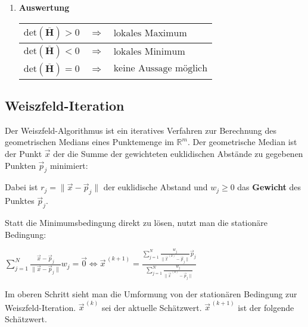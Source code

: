 \begin{enumerate}[itemsep=1ex]
    \item \textbf{Auswertung}\\
    \begin{tabular}{lll}
        \hline
        $\text{det}\left(\overline{\mathbf{H}}\right) > 0$ &$\Longrightarrow$& $\text{lokales Maximum}$\\
        \hline
        $\text{det}\left(\overline{\mathbf{H}}\right) < 0$ &$\Longrightarrow$& $\text{lokales Minimum}$\\
        \hline
        $\text{det}\left(\overline{\mathbf{H}}\right) = 0$ &$\Longrightarrow$& $\text{keine Aussage möglich}$\\
        \hline
    \end{tabular}

\end{enumerate}

\subsection{Weiszfeld-Iteration}
Der Weiszfeld-Algorithmus ist ein iteratives Verfahren zur Berechnung des
geometrischen Medians eines Punktemenge im $\mathbb{R}^m$. Der geometrische
Median ist der Punkt $\vec{x}$ der die Summe der gewichteten euklidischen Abstände
zu gegebenen Punkten $\vec{p}_j$ minimiert:
\begin{center}
\end{center}
\vspace{0.1cm}
Dabei ist $r_j = \parallel \vec{x} - \vec{p}_j \parallel$ der euklidische Abstand und $w_j \geq 0$ das \textbf{Gewicht} des Punktes $\vec{p}_j$.

\vspace{0.1cm}
Statt die Minimumsbedingung direkt zu lösen, nutzt man die stationäre Bedingung:
\vspace{0.1cm}

\begin{center}
    $\boxed{ \sum_{j = 1}^{N} \frac{\vec{x}-\vec{p}_j}{\parallel \vec{x} - \vec{p}_j \parallel}w_j = \vec{0} }
    \Leftrightarrow \boxed{\vec{x}^{\, (k+1)} = \frac{\sum_{j = 1}^{N} \frac{w_j}{\parallel \vec{x}^{\, (k)} - \vec{p}_j \parallel} \vec{p}_j}{\sum_{j = 1}^{N} \frac{w_j}{\parallel \vec{x}^{\, (k)} - \vec{p}_j \parallel}}}$
\end{center}

Im oberen Schritt sieht man die Umformung von der stationären Bedingung zur Weiszfeld-Iteration. $\vec{x}^{\,(k)}$ sei
der aktuelle Schätzwert. $\vec{x}^{\,(k + 1)}$ ist der folgende Schätzwert.
